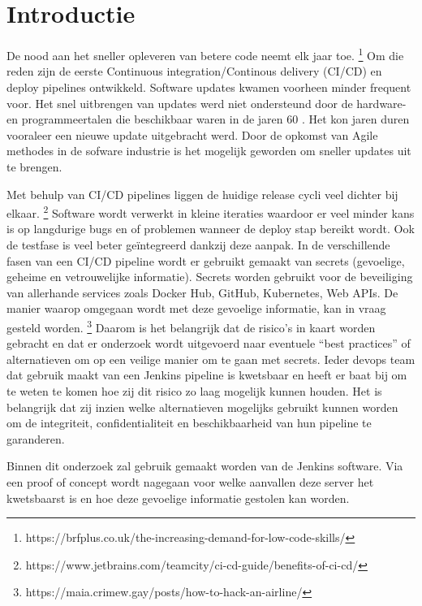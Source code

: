 
\section{Introductie}%
\label{sec:introductie}

De nood aan het sneller opleveren van betere code neemt elk jaar toe. \footnote{https://brfplus.co.uk/the-increasing-demand-for-low-code-skills/} Om die reden zijn de eerste Continuous integration/Continous delivery (CI/CD) en deploy pipelines ontwikkeld. Software updates kwamen voorheen minder frequent voor. Het snel uitbrengen van updates werd niet ondersteund door de hardware- en programmeertalen die beschikbaar waren in de jaren 60 \autocite{Jiang2009}. Het kon jaren duren vooraleer een nieuwe update uitgebracht werd. Door de opkomst van Agile methodes in de sofware industrie is het mogelijk geworden om sneller updates uit te brengen. 

Met behulp van CI/CD pipelines liggen de huidige release cycli veel dichter bij elkaar. \footnote{https://www.jetbrains.com/teamcity/ci-cd-guide/benefits-of-ci-cd/} Software wordt verwerkt in kleine iteraties waardoor er veel minder kans is op langdurige bugs en of problemen wanneer de deploy stap bereikt wordt. Ook de testfase is veel beter geïntegreerd dankzij deze aanpak. In de verschillende fasen van een CI/CD pipeline wordt er gebruikt gemaakt van secrets (gevoelige, geheime en vetrouwelijke informatie). Secrets worden gebruikt voor de beveiliging van allerhande services zoals Docker Hub, GitHub, Kubernetes, Web APIs. De manier waarop omgegaan wordt met deze gevoelige informatie, kan in vraag gesteld worden. \footnote{https://maia.crimew.gay/posts/how-to-hack-an-airline/} Daarom is het belangrijk dat de risico’s in kaart worden gebracht en dat er onderzoek wordt uitgevoerd naar eventuele “best practices” of alternatieven om op een veilige manier om te gaan met secrets. Ieder devops team dat gebruik maakt van een Jenkins pipeline is kwetsbaar en heeft er baat bij om te weten te komen hoe zij dit risico zo laag mogelijk kunnen houden. Het is belangrijk dat zij inzien welke alternatieven mogelijks gebruikt kunnen worden om de integriteit, confidentialiteit en beschikbaarheid van hun pipeline te garanderen.  

Binnen dit onderzoek zal gebruik gemaakt worden van de Jenkins software. Via een proof of concept wordt nagegaan voor welke aanvallen deze server het kwetsbaarst is en hoe deze gevoelige informatie gestolen kan worden.

